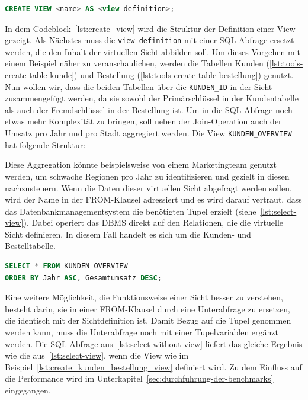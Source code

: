 \vspace{-5pt}
\begin{lstlisting}[language=SQL,caption=Allgemeine View-Deklaration,label={lst:create_view}]
CREATE VIEW <name> AS <view-definition>;
\end{lstlisting}
\vspace{-5pt}

In dem Codeblock~\ref{lst:create_view} wird die Struktur der Definition einer View gezeigt.
Als Nächstes muss die \texttt{view-definition} mit einer SQL-Abfrage ersetzt werden, die den Inhalt der virtuellen Sicht abbilden soll.
Um dieses Vorgehen mit einem Beispiel näher zu veranschaulichen, werden die Tabellen Kunden (\ref{lst:tools-create-table-kunde}) und Bestellung (\ref{lst:tools-create-table-bestellung}) genutzt.
Nun wollen wir, dass die beiden Tabellen über die \texttt{KUNDEN\_ID} in der Sicht zusammengefügt werden, da sie sowohl der Primärschlüssel in der Kundentabelle als auch der Fremdschlüssel in der Bestellung ist.
Um in die SQL-Abfrage noch etwas mehr Komplexität zu bringen, soll neben der Join-Operation auch der Umsatz pro Jahr und pro Stadt aggregiert werden.
Die View \texttt{KUNDEN\_OVERVIEW} hat folgende Struktur:

\vspace{-5pt}


Diese Aggregation könnte beispielsweise von einem Marketingteam genutzt werden, um schwache Regionen pro Jahr zu identifizieren und gezielt in diesen nachzusteuern.
Wenn die Daten dieser virtuellen Sicht abgefragt werden sollen, wird der Name in der FROM-Klausel adressiert und es wird darauf vertraut, dass das Datenbankmanagementsystem die benötigten Tupel erzielt (siehe~\ref{lst:select-view}).
Dabei operiert das DBMS direkt auf den Relationen, die die virtuelle Sicht definieren.
In diesem Fall handelt es sich um die Kunden- und Bestelltabelle.

\vspace{-5pt}
\begin{lstlisting}[language=SQL,caption=SQL-Befehl mit verwendeter View,label={lst:select-view}]
SELECT * FROM KUNDEN_OVERVIEW
ORDER BY Jahr ASC, Gesamtumsatz DESC;
\end{lstlisting}
\vspace{-5pt}

Eine weitere Möglichkeit, die Funktionsweise einer Sicht besser zu verstehen, besteht darin, sie in einer FROM-Klausel durch eine Unterabfrage zu ersetzen, die identisch mit der Sichtdefinition ist.
Damit Bezug auf die Tupel genommen werden kann, muss die Unterabfrage noch mit einer Tupelvariablen ergänzt werden.
Die SQL-Abfrage aus~\ref{lst:select-without-view} liefert das gleiche Ergebnis wie die aus~\ref{lst:select-view}, wenn die View wie im Beispiel~\ref{lst:create_kunden_bestellung_view} definiert wird.
Zu dem Einfluss auf die Performance wird im Unterkapitel~\ref{sec:durchfuhrung-der-benchmarks} eingegangen.

